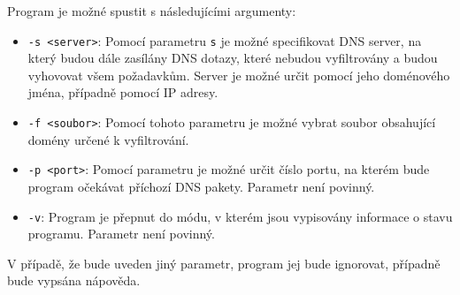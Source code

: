\documentclass[a4paper, 11pt]{article}
\begin{document}
	Program je možné spustit s následujícími argumenty:
	\begin{itemize}
	\item \texttt{-s <server>}: Pomocí parametru \texttt{s} je možné specifikovat DNS server, na který budou dále zasílány DNS dotazy, které nebudou vyfiltrovány a budou vyhovovat všem požadavkům. Server je možné určit pomocí jeho doménového jména, případně pomocí IP adresy.
	\item \texttt{-f <soubor>}: Pomocí tohoto parametru je možné vybrat soubor obsahující domény určené k vyfiltrování.
	\item \texttt{-p <port>}: Pomocí parametru je možné určit číslo portu, na kterém bude program očekávat příchozí DNS pakety. Parametr není povinný.
	\item \texttt{-v}: Program je přepnut do módu, v kterém jsou vypisovány informace o stavu programu. Parametr není povinný.
	\end{itemize}
	V případě, že bude uveden jiný parametr, program jej bude ignorovat, případně bude vypsána nápověda. 
		
\end{document}
